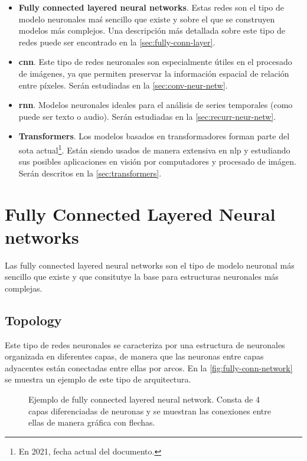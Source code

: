 \begin{itemize}
  \item \textbf{Fully connected layered neural networks}. Estas redes son el
  tipo de modelo neuronales maś sencillo que existe y sobre el que se
  construyen modelos más complejos. Una descripción más detallada sobre este
  tipo de redes puede ser encontrado en la \vref{sec:fully-conn-layer}.
  \item \textbf{\acrlong*{cnn}}. Este tipo de redes neuronales son
  especialmente útiles en el procesado de imágenes, ya que permiten preservar
  la información espacial de relación entre píxeles. Serán estudiadas en la
  \vref{sec:conv-neur-netw}.
  \item \textbf{\acrlong*{rnn}}. Modelos neuronales ideales para el análisis
  de series temporales (como puede ser texto o audio). Serán estudiadas en la
  \vref{sec:recurr-neur-netw}.
  \item \textbf{Transformers}. Los modelos basados en transformadores forman
  parte del \acrlong{sota} actual\footnote{En 2021, fecha actual del
    documento.}. Están siendo usados de manera extensiva en \gls{nlp} y
  estudiando sus posibles aplicaciones en visión por computadores y procesado
  de imágen. Serán descritos en la \vref{sec:transformers}.
\end{itemize}


\section{Fully Connected Layered Neural networks}
\label{sec:fully-conn-layer}

Las fully connected layered neural networks son el tipo de modelo neuronal más
sencillo que existe y que consitutye la base para estructuras neuronales más
complejas.

\subsection{Topology}
\label{sec:topology}

Este tipo de redes neuronales se caracteriza por una estructura de neuronales
organizada en diferentes capas, de manera que las neuronas entre capas
adyacentes están conectadas entre ellas por arcos. En la
\vref{fig:fully-conn-network} se muestra un ejemplo de este tipo de
arquitectura.

\begin{figure}[ht]
  \centering
  
  \caption[Fully Connected Neural Network topology]{Ejemplo de fully connected
    layered neural network. Consta de 4 capas diferenciadas de neuronas y se
    muestran las conexiones entre ellas de manera gráfica con flechas.}
  \label{fig:fully-conn-network}
\end{figure}


